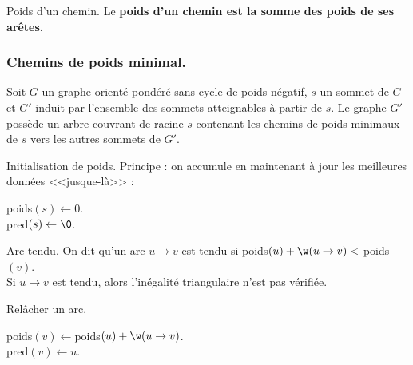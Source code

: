\documentclass[french, 11pt]{article}
\begin{document}
\vspace*{-0.7cm}

\begin{defi}{Poids d'un chemin.}{}
    Le \bf{poids} d'un chemin est la somme des poids de ses arêtes.
\end{defi}

\vspace*{-1cm}

\subsubsection{Chemins de poids minimal.}

\begin{prop}{}{}
    Soit $G$ un graphe orienté pondéré sans cycle de poids négatif, $s$ un sommet de $G$ et $G'$ induit par l'ensemble des sommets atteignables à partir de $s$. Le graphe $G'$ possède un arbre couvrant de racine $s$ contenant les chemins de poids minimaux de $s$ vers les autres sommets de $G'$.
\end{prop}

\vspace*{-0.7cm}

\begin{defi}{Initialisation de poids.}{}
    Principe : on accumule en maintenant à jour les meilleures données <<jusque-là>> :
    \hspace*{0.28cm}\begin{algorithm}[H]
        \LinesNumbered
        \caption{Initialisation de poids.}
        poids$(s)\gets0$.\\
        pred$(s)\gets\0$.\\
    \end{algorithm}
\end{defi}

\begin{defi}{Arc tendu.}{}
    On dit qu'un arc $u\to v$ est tendu si poids$(u)+\w(u\to v)<$ poids$(v)$.\\
    Si $u\to v$ est tendu, alors l'inégalité triangulaire n'est pas vérifiée.
\end{defi}

\vspace*{-0.7cm}

\begin{defi}{Relâcher un arc.}{}
    \hspace*{0.28cm}\begin{algorithm}[H]
        \LinesNumbered
        \caption{Relâcher un arc.}
        poids$(v)\gets$poids$(u)+\w(u\to v)$.\\
        pred$(v)\gets u$.
    \end{algorithm}
\end{defi}
\end{document}
